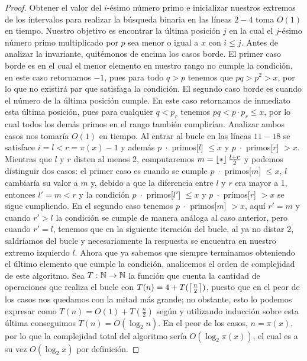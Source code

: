\begin{proof}
Obtener el valor del $i$-\'esimo n\'umero primo e inicializar
nuestros extremos de los intervalos para realizar la b\'usqueda binaria en las l\'ineas
$2 - 4$ toma $O(1)$ en tiempo.
Nuestro objetivo es encontrar la \'ultima posici\'on $j$ en la cual
el $j$-\'esimo n\'umero primo multiplicado por $p$ sea menor o igual a $x$ con $i \leq j$. Antes de analizar la invariante, quit\'emonos de encima los casos borde.
El primer caso borde es en el cual el menor elemento en nuestro rango no cumple la condici\'on,
en este caso retornamos $-1$, pues para todo $q > p$ tenemos que $pq > p^2 > x$,
por lo que no existir\'a par que satisfaga la condici\'on.
El segundo caso borde es cuando el n\'umero de la \'ultima posici\'on cumple.
En este caso retornamos de inmediato esta \'ultima posici\'on,
pues para cualquier $q < p_r$ tenemos $pq < p \cdot p_r \leq x$,
por lo cual todos los dem\'as primos en el rango tambi\'en cumplir\'ian.
Analizar ambos casos nos tomar\'ia $O(1)$ en tiempo.
Al entrar al bucle en las l\'ineas $11 - 18$ se satisface $i = l < r = \pi(x) - 1$ y adem\'as
$p\;\cdot$ primos[$l$] $\leq x$ y $p\;\cdot$ primos[$r$] $> x$.
Mientras que $l$ y $r$ disten al menos 2, computaremos $m = \left\lfloor * \right\rfloor{\frac{l + r}{2}}$
y podemos distinguir dos casos:
el primer caso es cuando se cumple $p\;\cdot$ primos[$m$] $\leq x$, $l$ cambiar\'ia
su valor a $m$ y, debido a que la diferencia entre $l$ y $r$ era mayor a 1, entonces
$l' = m < r$ y la condici\'on $p\;\cdot$ primos[$l'$] $\leq x$ y $p\;\cdot$ primos[$r$] $> x$ se sigue cumpliendo.
En el segundo caso tenemos $p\;\cdot$ primos[$m$] $> x$, aqu\'i $r' = m$ y cuando $r' > l$ la condici\'on se cumple de manera an\'aloga al caso anterior,
pero cuando $r' = l$, tenemos que en la siguiente iteraci\'on del bucle, al ya no distar $2$, saldr\'iamos del bucle
y necesariamente la respuesta se encuentra en nuestro extremo izquierdo $l$.
Ahora que ya sabemos que siempre terminamos obteniendo el \'ultimo elemento que cumple la condici\'on, analicemos el
orden de complejidad de este algoritmo. Sea $T: \mathbb{N} \to \mathbb{N}$ la funci\'on que cuenta la cantidad de operaciones
que realiza el bucle con $T(n) = 4 + T(\left\lceil \frac{n}{2} \right\rceil)$,
puesto que en el peor de los casos nos quedamos con la mitad m\'as grande;
no obstante, esto lo podemos expresar como $T(n) = O(1) + T(\frac{n}{2})$ seg\'un \cite{CLRS}
y utilizando inducci\'on sobre esta \'ultima conseguimos $T(n) = O(\log_2 n)$.
En el peor de los casos, $n = \pi(x)$, por lo que la complejidad total del algoritmo ser\'ia
$O(\log_2 \pi(x))$, el cual es a su vez $O(\log_2 x)$ por definici\'on.
\end{proof}

